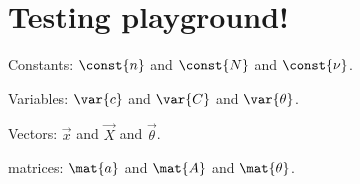 \documentclass[\home/main.tex]{subfiles}
\begin{document}
\chapter{Testing playground!} \label{ch:fsds}

Constants: $\const{n}$ and $\const{N}$ and $\const{\nu}$.

Variables: $\var{c}$ and $\var{C}$ and $\var{\theta}$.

Vectors: $\vec{x}$ and $\vec{X}$ and $\vec{\theta}$.

matrices: $\mat{a}$ and $\mat{A}$ and $\mat{\theta}$.
\end{document}
